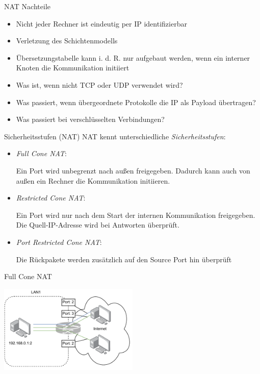 \begin{bonus}{NAT Nachteile}
    \begin{itemize}
        \item Nicht jeder Rechner ist eindeutig per IP identifizierbar
        \item Verletzung des Schichtenmodells
        \item Übersetzungstabelle kann i. d. R. nur aufgebaut werden, wenn ein interner Knoten die Kommunikation initiiert
        \item Was ist, wenn nicht TCP oder UDP verwendet wird?
        \item Was passiert, wenn übergeordnete Protokolle die IP als Payload übertragen?
        \item Was passiert bei verschlüsselten Verbindungen?
    \end{itemize}
\end{bonus}

\begin{bonus}{Sicherheitsstufen (NAT)}
    NAT kennt unterschiedliche \emph{Sicherheitsstufen}:
    \begin{itemize}
        \item \emph{Full Cone NAT}:

              Ein Port wird unbegrenzt nach außen freigegeben.
              Dadurch kann auch von außen ein Rechner die Kommunikation initiieren.
        \item \emph{Restricted Cone NAT}:

              Ein Port wird nur nach dem Start der internen Kommunikation freigegeben.
              Die Quell-IP-Adresse wird bei Antworten überprüft.
        \item \emph{Port Restricted Cone NAT}:

              Die Rückpakete werden zusätzlich auf den Source Port hin überprüft
    \end{itemize}
\end{bonus}

\begin{example}{Full Cone NAT}
    \begin{center}
        \includegraphics[width=0.5\textwidth]{includes/figures/bonus_full_cone_nat.pdf}
    \end{center}
\end{example}

